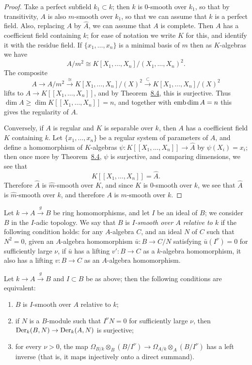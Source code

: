 \begin{proof}
Take a perfect subfield $k_1 \subset k$; then $k$ is 0-smooth over $k_1$, so that by
transitivity, $A$ is also $m$-smooth over $k_1$, so that we can assume that $k$ is a
perfect field. Also, replacing $A$ by $\hat{A}$, we can assume that $A$ is complete.
Then $A$ has a coefficient field containing $k$; for ease of notation we write $K$
for this, and identify it with the residue field. If $\{x_1, \ldots, x_n\}$ is a minimal
basis of $m$ then as $K$-algebras we have
\[
  A/m^2 \cong K[X_1, \ldots, X_n]/(X_1, \ldots, X_n)^2.
\]
The composite
\[
  A \to A/m^2 \xrightarrow{\cong} K[X_1, \ldots, X_n]/(X)^2 \xrightarrow{\subset} K[X_1, \ldots, X_n]/(X)^2
\]
lifts to $A \to K[[X_1, \ldots, X_n]]$, and by Theorem~\hyperref[thm:8.4]{8.4}, this is surjective. Thus
$\dim A \ge \dim K[[X_1, \ldots, X_n]] = n$, and together with $\operatorname{emb\,dim} A = n$ this
gives the regularity of $A$.

Conversely, if $A$ is regular and $K$ is separable over $k$, then $A$ has a
coefficient field $K$ containing $k$. Let $\{x_1, \ldots, x_n\}$ be a regular system of
parameters of $A$, and define a homomorphism of $K$-algebras
$\psi\colon K[[X_1, \ldots, X_n]] \to \hat{A}$ by $\psi(X_i) = x_i$; then once more by
Theorem~\hyperref[thm:8.4]{8.4}, $\psi$ is surjective, and comparing dimensions, we see that
\[
  K[[X_1, \ldots, X_n]] = \hat{A}.
\]
Therefore $\hat{A}$ is $\hat{m}$-smooth over $K$, and since $K$ is 0-smooth over $k$, we see
that $\hat{A}$ is $\hat{m}$-smooth over $k$, and therefore $A$ is $m$-smooth over $k$.
\end{proof}

Let $k \to A \xrightarrow{g} B$ be ring homomorphisms, and let $I$ be an ideal of $B$; we
consider $B$ in the $I$-adic topology. We say that $B$ is \emph{$I$-smooth over $A$ relative
to $k$} if the following condition holds: for any $A$-algebra $C$, and an ideal $N$ of
$C$ such that $N^2 = 0$, given an $A$-algebra homomorphism $\bar{u}\colon B \to C/N$
satisfying $\bar{u}(I^\nu) = 0$ for sufficiently large $\nu$, if $\bar{u}$ has a lifting
$v'\colon B \to C$ as a $k$-algebra homomorphism, it also has a lifting $v\colon B \to C$ as an
$A$-algebra homomorphism.

\begin{theorem}\label{thm:28.4}
Let $k \to A \xrightarrow{g} B$ and $I \subset B$ be as above; then the following conditions
are equivalent:
\begin{enumerate}[(1)]
  \item $B$ is $I$-smooth over $A$ relative to $k$;
  \item if $N$ is a $B$-module such that $I^\nu N = 0$ for sufficiently large $\nu$, then
        $\operatorname{Der}_k(B, N) \to \operatorname{Der}_k(A, N)$ is surjective;
  \item for every $\nu > 0$, the map $\Omega_{B/k} \otimes_B (B/I^\nu) \to
        \Omega_{A/k} \otimes_A (B/I^\nu)$ has a left inverse (that is, it maps injectively onto
        a direct summand).
\end{enumerate}
\end{theorem}

